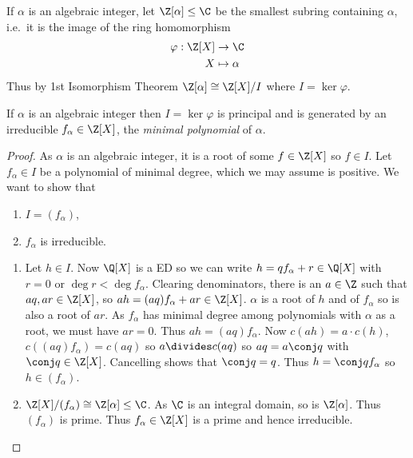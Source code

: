 \documentclass[a4paper]{article}
\theoremstyle{definition}
\begin{document}
If \(\alpha\) is an algebraic integer, let \(\Z[\alpha] \leq \C\) be the smallest subring containing \(\alpha\), i.e.\ it is the image of the ring homomorphism
\begin{align*}
  \varphi: \Z[X] &\to \C \\
  X &\mapsto \alpha
\end{align*}
Thus by 1st Isomorphism Theorem \(\Z[\alpha] \cong \Z[X]/I\) where \(I = \ker \varphi\).

\begin{proposition}
  If \(\alpha\) is an algebraic integer then \(I = \ker \varphi\) is principal and is generated by an irreducible \(f_\alpha \in \Z[X]\), the \emph{minimal polynomial} of \(\alpha\).
\end{proposition}

\begin{proof}
  As \(\alpha\) is an algebraic integer, it is a root of some \(f \in \Z[X]\) so \(f \in I\). Let \(f_\alpha \in I\) be a polynomial of minimal degree, which we may assume is positive. We want to show that
  \begin{enumerate}
  \item \(I = (f_\alpha)\),
  \item \(f_\alpha\) is irreducible.
  \end{enumerate}

  \begin{enumerate}
  \item Let \(h \in I\). Now \(\Q[X]\) is a ED so we can write \(h = qf_\alpha + r \in \Q[X]\) with \(r = 0\) or \(\deg r < \deg f_\alpha\). Clearing denominators, there is an \(a \in \Z\) such that \(aq, ar \in \Z[X]\), so \(ah = (aq) f_\alpha + ar \in \Z[X]\). \(\alpha\) is a root of \(h\) and of \(f_\alpha\) so is also a root of \(ar\). As \(f_\alpha\) has minimal degree among polynomials with \(\alpha\) as a root, we must have \(ar = 0\). Thus \(ah = (aq) f_\alpha\). Now \(c(ah) = a \cdot c(h)\), \(c((aq)f_\alpha) = c(aq)\) so \(a \divides c(aq)\) so \(aq = a\conj q\) with \(\conj q \in \Z[X]\). Cancelling shows that \(\conj q = q\). Thus \(h = \conj q f_\alpha\) so \(h \in (f_\alpha)\).
  \item \(\Z[X]/(f_\alpha) \cong \Z[\alpha] \leq \C\). As \(\C\) is an integral domain, so is \(\Z[\alpha]\). Thus \((f_\alpha)\) is prime. Thus \(f_\alpha \in \Z[X]\) is a prime and hence irreducible.
  \end{enumerate}
\end{proof}
\end{document}
